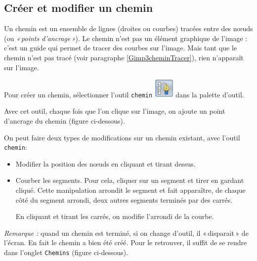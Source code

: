 \subsection{Créer et modifier un chemin}\label{Gimp3cheminCreer} 

Un chemin est un ensemble de lignes (droites ou courbes) tracées entre des nœuds (ou \emph{«\,points d'ancrage\,»}). Le chemin n'est pas un élément graphique de l'image : c'est un guide qui permet de tracer des courbes sur l'image. Mais tant que le chemin n'est pas tracé (voir paragraphe \vref{Gimp3cheminTracer}), rien n'apparaît sur l'image. 

Pour créer un chemin, sélectionner l'outil \texttt{chemin} \includegraphics[width=1cm]{./images/image03/Chemin01} dans la palette d'outil.

Avec cet outil, chaque fois que l'on clique sur l'image, on ajoute un point d'ancrage du chemin (figure ci-dessous).



On peut faire deux types de modifications sur un chemin existant, avec l'outil \texttt{chemin}: 
\begin{itemize}
\item Modifier la position des nœuds en cliquant et tirant dessus.
\item Courber les segments. Pour cela, cliquer sur un segment et tirer en gardant cliqué. Cette manipulation arrondit le segment et fait apparaître, de chaque côté du segment arrondi, deux autres segments terminés par des carrés. 


En cliquant et tirant les carrés, on modifie l'arrondi de la courbe.
\end{itemize}


\emph{Remarque :} quand un chemin est terminé, si on change d'outil, il «\,disparait\,» de l'écran. En fait le chemin a bien été créé. Pour le retrouver, il suffit de se rendre dans l'onglet \texttt{Chemins} (figure ci-dessous).








